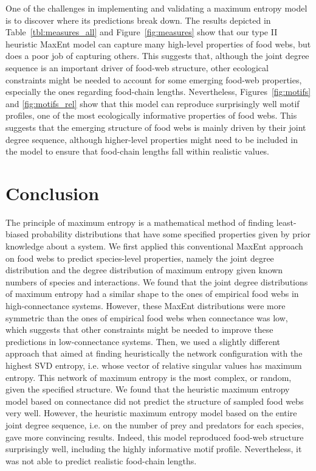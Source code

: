 One of the challenges in implementing and validating a maximum entropy model is
to discover where its predictions break down. The results depicted in
Table~\ref{tbl:measures_all} and Figure~\ref{fig:measures} show that our type II heuristic
MaxEnt model can capture many high-level properties of food webs, but does a
poor job of capturing others. This suggests that, although the joint degree
sequence is an important driver of food-web structure, other ecological
constraints might be needed to account for some emerging food-web properties,
especially the ones regarding food-chain lengths. Nevertheless,
Figures~\ref{fig:motifs} and \ref{fig:motifs_rel} show that this model can reproduce
surprisingly well motif profiles, one of the most ecologically informative
properties of food webs. This suggests that the emerging structure of food webs
is mainly driven by their joint degree sequence, although higher-level
properties might need to be included in the model to ensure that food-chain
lengths fall within realistic values. 


\section{Conclusion}

The principle of maximum entropy is a mathematical method of finding
least-biased probability distributions that have some specified properties given
by prior knowledge about a system. We first applied this conventional MaxEnt
approach on food webs to predict species-level properties, namely the joint
degree distribution and the degree distribution of maximum entropy given known
numbers of species and interactions. We found that the joint degree
distributions of maximum entropy had a similar shape to the ones of empirical
food webs in high-connectance systems. However, these MaxEnt distributions were
more symmetric than the ones of empirical food webs when connectance was low,
which suggests that other constraints might be needed to improve these
predictions in low-connectance systems. Then, we used a slightly different
approach that aimed at finding heuristically the network configuration with the
highest SVD entropy, i.e. whose vector of relative singular values has maximum
entropy. This network of maximum entropy is the most complex, or random, given
the specified structure. We found that the heuristic maximum entropy model based
on connectance did not predict the structure of sampled food webs very well.
However, the heuristic maximum entropy model based on the entire joint degree
sequence, i.e. on the number of prey and predators for each species, gave more
convincing results. Indeed, this model reproduced food-web structure
surprisingly well, including the highly informative motif profile. Nevertheless,
it was not able to predict realistic food-chain lengths. 

